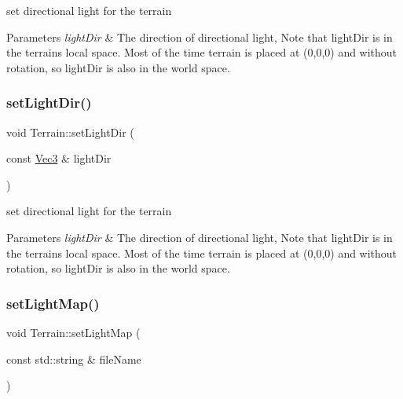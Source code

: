 set directional light for the terrain 
\begin{DoxyParams}{Parameters}
{\em light\+Dir} & The direction of directional light, Note that light\+Dir is in the terrain\textquotesingle{}s local space. Most of the time terrain is placed at (0,0,0) and without rotation, so light\+Dir is also in the world space. \\
\hline
\end{DoxyParams}
\mbox{\label{classTerrain_a4fb4d880c5033dcbf89f69ceddf5f8b0}} 
\subsubsection{\texorpdfstring{set\+Light\+Dir()}{setLightDir()}\hspace{0.1cm}{\footnotesize\ttfamily [2/2]}}
{\footnotesize\ttfamily void Terrain\+::set\+Light\+Dir (\begin{DoxyParamCaption}\item[{const \hyperlink{classVec3}{Vec3} \&}]{light\+Dir }\end{DoxyParamCaption})}

set directional light for the terrain 
\begin{DoxyParams}{Parameters}
{\em light\+Dir} & The direction of directional light, Note that light\+Dir is in the terrain\textquotesingle{}s local space. Most of the time terrain is placed at (0,0,0) and without rotation, so light\+Dir is also in the world space. \\
\hline
\end{DoxyParams}
\mbox{\label{classTerrain_a296f207c5fae616a75099156ef8cd0ac}} 
\subsubsection{\texorpdfstring{set\+Light\+Map()}{setLightMap()}\hspace{0.1cm}{\footnotesize\ttfamily [1/2]}}
{\footnotesize\ttfamily void Terrain\+::set\+Light\+Map (\begin{DoxyParamCaption}\item[{const std\+::string \&}]{file\+Name }\end{DoxyParamCaption})}


